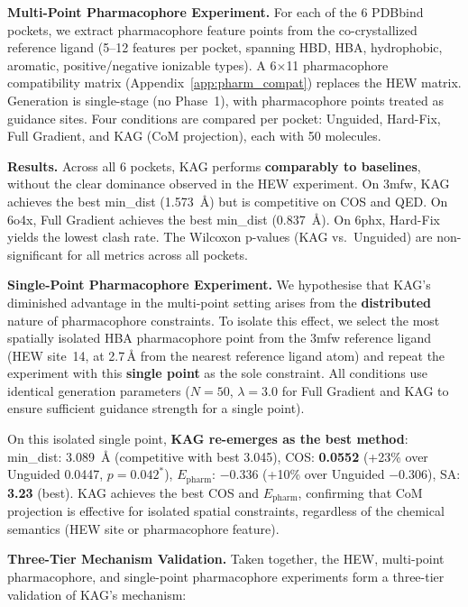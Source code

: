 \documentclass{article}
\begin{document}
\textbf{Multi-Point Pharmacophore Experiment.}
For each of the 6 PDBbind pockets, we extract pharmacophore feature
points from the co-crystallized reference ligand (5--12 features per
pocket, spanning HBD, HBA, hydrophobic, aromatic, positive/negative
ionizable types).  A 6$\times$11 pharmacophore compatibility matrix
(Appendix~\ref{app:pharm_compat}) replaces the HEW matrix.
Generation is single-stage (no Phase~1), with pharmacophore points
treated as guidance sites.  Four conditions are compared per pocket:
Unguided, Hard-Fix, Full Gradient, and KAG (CoM projection), each with
50 molecules.

\textbf{Results.}
Across all 6 pockets, KAG performs \textbf{comparably to baselines},
without the clear dominance observed in the HEW experiment.
On 3mfw, KAG achieves the best min\_dist (1.573~\AA{}) but is
competitive on COS and QED.  On 6o4x, Full Gradient achieves the best
min\_dist (0.837~\AA{}).  On 6phx, Hard-Fix yields the lowest clash
rate.  The Wilcoxon p-values (KAG vs.\ Unguided) are non-significant for
all metrics across all pockets.

\textbf{Single-Point Pharmacophore Experiment.}
We hypothesise that KAG's diminished advantage in the multi-point setting
arises from the \textbf{distributed} nature of pharmacophore constraints.
To isolate this effect, we select the most spatially isolated HBA
pharmacophore point from the 3mfw reference ligand (HEW site~14, at
2.7\,\AA{} from the nearest reference ligand atom) and repeat the
experiment with this \textbf{single point} as the sole constraint.
All conditions use identical generation parameters ($N=50$,
$\lambda=3.0$ for Full Gradient and KAG to ensure sufficient guidance
strength for a single point).

On this isolated single point, \textbf{KAG re-emerges as the best
method}:
min\_dist: 3.089~\AA{} (competitive with best 3.045),
COS: \textbf{0.0552} (+23\% over Unguided 0.0447, $p=0.042^*$),
$E_{\text{pharm}}$: \textbf{$-0.336$} (+10\% over Unguided $-0.306$),
SA: \textbf{3.23} (best).
KAG achieves the best COS and $E_{\text{pharm}}$, confirming that
CoM projection is effective for isolated spatial constraints,
regardless of the chemical semantics (HEW site or pharmacophore feature).

\textbf{Three-Tier Mechanism Validation.}
Taken together, the HEW, multi-point pharmacophore, and single-point
pharmacophore experiments form a three-tier validation of KAG's
mechanism:
\end{document}
